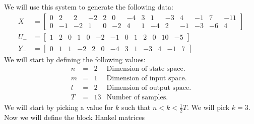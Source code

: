 We will use this system to generate the following data:
\begin{align*}
	X   &= \begin{bmatrix} 0& 2& 2&-2&2& 0&-4&3& 1&-3& 4&-1& 7&-11 \\ 
	                       0&-1&-2& 1&0&-2& 4&1&-4& 2&-1&-3&-6& 4 \end{bmatrix} \\
	U_- &= \begin{bmatrix} 1& 2& 0& 1&0&-2&-1&0& 1& 2& 0&10&-5 \end{bmatrix} \\
	Y_- &= \begin{bmatrix} 0& 1& 1&-2&2& 0&-4&3& 1&-3& 4&-1& 7 \end{bmatrix} 
\end{align*}
We will start by defining the following values:
\[\begin{array}{rcll}
	n & = & 2 & \mbox{Dimension of state space.} \\
	m & = & 1 & \mbox{Dimension of input space.} \\
	l & = & 2 & \mbox{Dimension of output space.} \\
	T & = & 13 & \mbox{Number of samples.}
\end{array}\]
We will start by picking a value for $k$ such that $n < k < \frac{1}{2} T$. We will pick $k = 3$. Now we will define the block Hankel matrices
